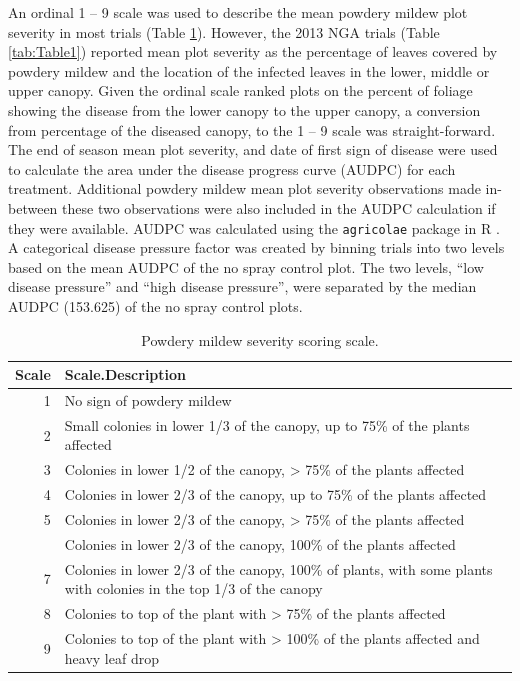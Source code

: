 \documentclass[agronomy,article,submit,moreauthors,pdftex]{mdpi}
\begin{document}
An ordinal 1 -- 9 scale was used to describe the mean powdery mildew plot severity in most trials (Table \ref{tab:Table2}).
However, the 2013 NGA trials (Table \ref{tab:Table1}) reported mean plot severity as the percentage of leaves covered by powdery mildew and the location of the infected leaves in the lower, middle or upper canopy.
Given the ordinal scale ranked plots on the percent of foliage showing the disease from the lower canopy to the upper canopy, a conversion from percentage of the diseased canopy, to the 1 -- 9 scale was straight-forward.
The end of season mean plot severity, and date of first sign of disease were used to calculate the area under the disease progress curve (AUDPC) for each treatment.
Additional powdery mildew mean plot severity observations made in-between these two observations were also included in the AUDPC calculation if they were available.
AUDPC was calculated using the \texttt{agricolae} package in R \citep{agricolae2020}.
A categorical disease pressure factor was created by binning trials into two levels based on the mean AUDPC of the no spray control plot.
The two levels, ``low disease pressure'' and ``high disease pressure'', were separated by the median AUDPC (153.625) of the no spray control plots.

\begin{table}

\caption{\label{tab:Table2}Powdery mildew severity scoring scale.}
\centering
\begin{tabular}[t]{rl}
\toprule
Scale & Scale.Description\\
\midrule
1 & No sign of powdery mildew\\
2 & Small colonies in lower 1/3 of the canopy, up to 75\% of the plants affected\\
3 & Colonies in lower 1/2 of the canopy, > 75\% of the plants affected\\
4 & Colonies in lower 2/3 of the canopy, up to 75\% of the plants affected\\
5 & Colonies in lower 2/3 of the canopy, > 75\% of the plants affected\\
\addlinespace
6 & Colonies in lower 2/3 of the canopy, 100\% of the plants affected\\
7 & Colonies in lower 2/3 of the canopy, 100\% of plants, with some plants with colonies in the top 1/3 of the canopy\\
8 & Colonies to top of the plant with > 75\% of the plants affected\\
9 & Colonies to top of the plant with > 100\% of the plants affected and heavy leaf drop\\
\bottomrule
\end{tabular}
\end{table}
\end{document}
